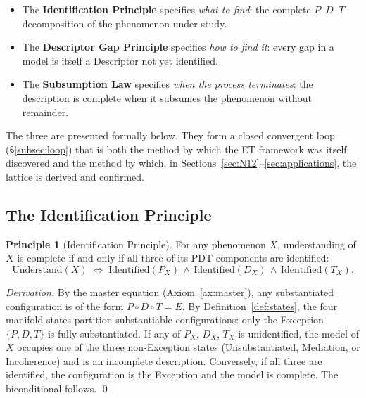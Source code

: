 \documentclass[11pt,a4paper]{article}
\theoremstyle{definition}
\newtheorem{principle}[theorem]{Principle}
\theoremstyle{remark}
\begin{document}
\begin{itemize}[leftmargin=*]
\item The \textbf{Identification Principle} specifies \emph{what to find}: the complete $P$--$D$--$T$ decomposition of the phenomenon under study.
\item The \textbf{Descriptor Gap Principle} specifies \emph{how to find it}: every gap in a model is itself a Descriptor not yet identified.
\item The \textbf{Subsumption Law} specifies \emph{when the process terminates}: the description is complete when it subsumes the phenomenon without remainder.
\end{itemize}

The three are presented formally below. They form a closed convergent loop (\S\ref{subsec:loop}) that is both the method by which the ET framework was itself discovered and the method by which, in Sections~\ref{sec:N12}--\ref{sec:applications}, the lattice is derived and confirmed.

\subsection{The Identification Principle}\label{subsec:identification}

\begin{principle}[Identification Principle]\label{princ:identification}
For any phenomenon $X$, understanding of $X$ is complete if and only if all three of its PDT components are identified:
\[
\boxed{\;\mathrm{Understand}(X) \;\iff\; \mathrm{Identified}(P_{X}) \,\land\, \mathrm{Identified}(D_{X}) \,\land\, \mathrm{Identified}(T_{X}).\;}
\]
\end{principle}

\begin{proof}[Derivation]
By the master equation (Axiom~\ref{ax:master}), any substantiated configuration is of the form $P\circ D\circ T = E$. By Definition~\ref{def:states}, the four manifold states partition substantiable configurations: only the Exception $\{P,D,T\}$ is fully substantiated. If any of $P_{X}$, $D_{X}$, $T_{X}$ is unidentified, the model of $X$ occupies one of the three non-Exception states (Unsubstantiated, Mediation, or Incoherence) and is an incomplete description. Conversely, if all three are identified, the configuration is the Exception and the model is complete. The biconditional follows. \qed
\end{proof}
\end{document}
